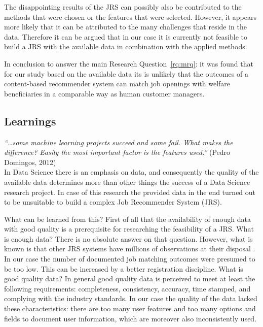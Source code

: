The disappointing results of the JRS can possibly also be contributed to the methods that were chosen or the features that were selected. 
However, it appears more likely that it can be attributed to the many challenges that reside in the data.
Therefore it can be argued that in our case it is currently not feasible to build a JRS with the available data in combination with the applied methods. 

In conclusion to answer the main Research Question~\ref{rq:mrq}: it was found that for our study based on the available data its is unlikely that the outcomes of a content-based recommender system can match job openings with welfare beneficiaries in a comparable way as human customer managers. 
\subsection{Learnings}
\label{ssec:learnings}

\textit{“…some machine learning projects succeed and some fail. What makes the difference?  Easily the most important factor is the features used.”} (Pedro Domingos, 2012) \nocite{domingos2012few} \\

\noindent In Data Science there is an emphasis on data, and consequently the quality of the available data determines more than other things the success of a Data Science research project.
In case of this research the provided data in the end turned out to be unsuitable to build a complex Job Recommender System (JRS). 

What can be learned from this? 
First of all that the availability of enough data with good quality is a prerequisite for researching the feasibility of a JRS.
What is enough data?
There is no absolute answer on that question. 
However, what is known is that other JRS systems have millions of observations at their disposal \cite{kenthapadi2017personalized, T.Al-Otaibi2012ASystems, Zheng2012JobSurvey, hong2013job}.
In our case the number of documented job matching outcomes were presumed to be too low. 
This can be increased by a better registration discipline.
What is good quality data?
In general good quality data is perceived to meet at least the following requirements: completeness, consistency, accuracy, time stamped, and complying with the industry standards. 
In our case the quality of the data lacked these characteristics: there are too many user features and too many options and fields to document user information, which are moreover also inconsistently used. 

